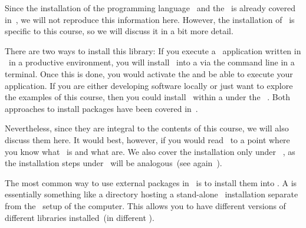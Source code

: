 %
\label{sec:installPsycopg}%
%
Since the installation of the programming language \python\ and the  \pycharm\ is already covered in~\cite{programmingWithPython}, we will not reproduce this information here.
However, the installation of \psycopg\ is specific to this course, so we will discuss it in a bit more detail.

There are two ways to install this library:
If you execute a \db\ application written in \python\ in a productive environment, you will install \psycopg\ into a  via the command line in a terminal.
Once this is done, you would activate the  and be able to execute your application.
If you are either developing software locally or just want to explore the examples of this course, then you could install \psycopg\ within a  under the \pycharm\ .
Both approaches to install packages have been covered in~\cite{programmingWithPython}.

Nevertheless, since they are integral to the contents of this course, we will also discuss them here.
It would best, however, if you would read~\cite{programmingWithPython} to a point where you know what \pip\ is and what  are.
We also cover the installation only under \ubuntu\ \linux, as the installation steps under \microsoftWindows\ will be analogous~(see again~\cite{programmingWithPython}).

The most common way to use external packages in \python\ is to install them into .
A  is essentially something like a directory hosting a stand-alone \python\ installation separate from the \python\ setup of the computer.
This allows you to have different versions of different libraries installed~(in different ).

